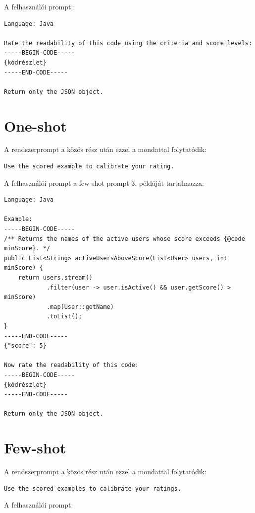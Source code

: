 \documentclass[
]{elteikthesis}[2024/04/26]
\begin{document}
A felhasználói prompt:

\begin{lstlisting}[breaklines=true]
Language: Java

Rate the readability of this code using the criteria and score levels:
-----BEGIN-CODE-----
{kódrészlet}
-----END-CODE-----

Return only the JSON object.
\end{lstlisting}

\section*{One-shot}

A rendszerprompt a közös rész után ezzel a mondattal folytatódik:

\begin{lstlisting}[breaklines=true]
Use the scored example to calibrate your rating.
\end{lstlisting}

A felhasználói prompt a few-shot prompt 3. példáját tartalmazza:

\begin{lstlisting}[breaklines=true]
Language: Java

Example:
-----BEGIN-CODE-----
/** Returns the names of the active users whose score exceeds {@code minScore}. */
public List<String> activeUsersAboveScore(List<User> users, int minScore) {
    return users.stream()
            .filter(user -> user.isActive() && user.getScore() > minScore)
            .map(User::getName)
            .toList();
}
-----END-CODE-----
{"score": 5}

Now rate the readability of this code:
-----BEGIN-CODE-----
{kódrészlet}
-----END-CODE-----

Return only the JSON object.
\end{lstlisting}

\section*{Few-shot}

A rendszerprompt a közös rész után ezzel a mondattal folytatódik:

\begin{lstlisting}[breaklines=true]
Use the scored examples to calibrate your ratings.
\end{lstlisting}

A felhasználói prompt:
\end{document}
